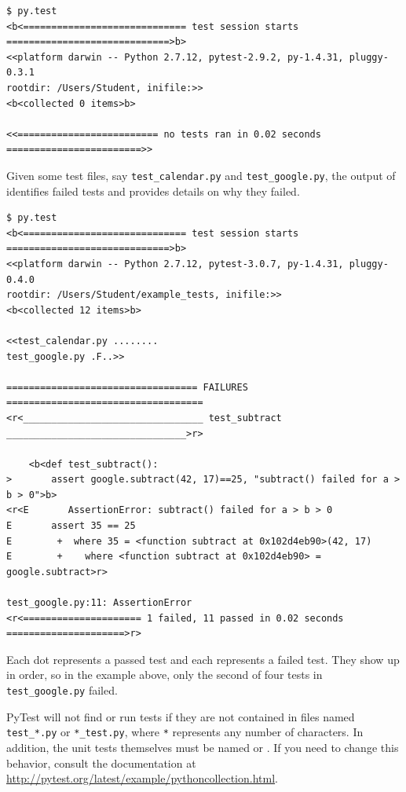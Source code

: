 \begin{lstlisting}
$ py.test
<b<============================= test session starts =============================>b>
<<platform darwin -- Python 2.7.12, pytest-2.9.2, py-1.4.31, pluggy-0.3.1
rootdir: /Users/Student, inifile:>>
<b<collected 0 items>b>

<<========================= no tests ran in 0.02 seconds ========================>>
\end{lstlisting}

Given some test files, say \texttt{test\_calendar.py} and \texttt{test\_google.py}, the output of  identifies failed tests and provides details on why they failed.

\begin{lstlisting}
$ py.test
<b<============================= test session starts =============================>b>
<<platform darwin -- Python 2.7.12, pytest-3.0.7, py-1.4.31, pluggy-0.4.0
rootdir: /Users/Student/example_tests, inifile:>>
<b<collected 12 items>b>

<<test_calendar.py ........
test_google.py .F..>>

================================== FAILURES ===================================
<r<________________________________ test_subtract ________________________________>r>

    <b<def test_subtract():
>       assert google.subtract(42, 17)==25, "subtract() failed for a > b > 0">b>
<r<E       AssertionError: subtract() failed for a > b > 0
E       assert 35 == 25
E        +  where 35 = <function subtract at 0x102d4eb90>(42, 17)
E        +    where <function subtract at 0x102d4eb90> = google.subtract>r>

test_google.py:11: AssertionError
<r<===================== 1 failed, 11 passed in 0.02 seconds =====================>r>
\end{lstlisting}

Each dot represents a passed test and each  represents a failed test. %
They show up in order, so in the example above, only the second of four tests in \texttt{test\_google.py} failed.

\begin{warn} %
PyTest will not find or run tests if they are not contained in files named \texttt{test\_*.py} or \texttt{*\_test.py}, where \texttt{*} represents any number of characters.
In addition, the unit tests themselves must be named  or .
If you need to change this behavior, consult the documentation at \url{http://pytest.org/latest/example/pythoncollection.html}.
\end{warn}

